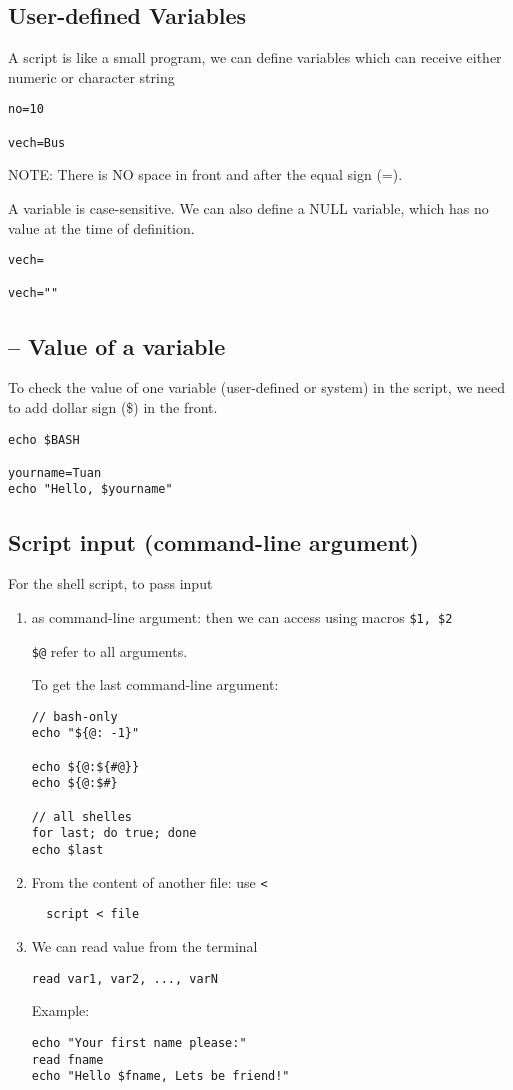 \subsection{User-defined Variables}

A script is like a small program, we can define variables which can receive
either numeric or character string
\begin{verbatim}
no=10

vech=Bus
\end{verbatim}
NOTE: There is NO space in front and after the equal sign (=).

A variable is case-sensitive. We can also define a NULL variable, which has no
value at the time of definition.
\begin{verbatim}
vech=

vech=""
\end{verbatim}

\subsection{-- Value of a variable}

To check the value of one variable (user-defined or system) in the script, we
need to add dollar sign (\$) in the front.
\begin{verbatim}
echo $BASH

yourname=Tuan
echo "Hello, $yourname"
\end{verbatim}

\subsection{Script input (command-line argument)}

For the shell script, to pass input  
\begin{enumerate}
  \item as command-line argument: then we can access using macros
  \verb!$1, $2!
  

\verb!$@! refer to all arguments.

To get the last command-line argument:
\begin{verbatim}
// bash-only
echo "${@: -1}"

echo ${@:${#@}} 
echo ${@:$#}

// all shelles
for last; do true; done
echo $last
\end{verbatim}

  \item From the content of another file: use \verb!<!
  \begin{verbatim}
  script < file
  \end{verbatim}
  
  \item We can read value from the terminal
\begin{verbatim}
read var1, var2, ..., varN
\end{verbatim}

Example:
\begin{verbatim}
echo "Your first name please:"
read fname
echo "Hello $fname, Lets be friend!"
\end{verbatim}
\end{enumerate}


